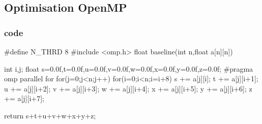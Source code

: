 \documentclass{report}
\begin{document}
  \subsection{Optimisation OpenMP}
  \subsubsection{code}
  \begin{cc}
    #define N_THRD 8
    #include <omp.h>
    float baseline(int n,float a[n][n])
    {
        int i,j;
        float s=0.0f,t=0.0f,u=0.0f,v=0.0f,w=0.0f,x=0.0f,y=0.0f,z=0.0f;
        #pragma omp parallel for
        for(j=0;j<n;j++)
          for(i=0;i<n;i=i+8)
          {
                s += a[j][i];
                t += a[j][i+1];
                u += a[j][i+2];
                v += a[j][i+3];
                w += a[j][i+4];
                x += a[j][i+5];
                y += a[j][i+6];
                z += a[j][i+7];
          }

        return s+t+u+v+w+x+y+z;
    }
  \end{cc}
\end{document}
